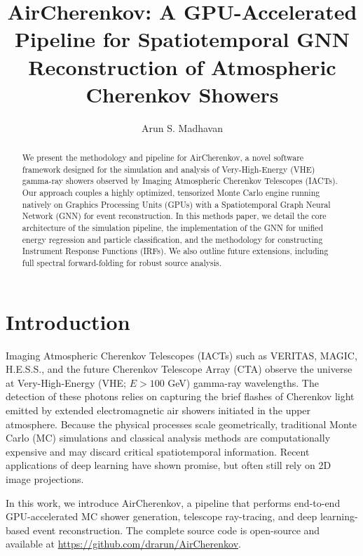 \documentclass[twocolumn,times]{aastex631}
\begin{document}
\title{AirCherenkov: A GPU-Accelerated Pipeline for Spatiotemporal GNN Reconstruction of Atmospheric Cherenkov Showers}

\author{Arun S. Madhavan}

\begin{abstract}
We present the methodology and pipeline for AirCherenkov, a novel software framework designed for the simulation and analysis of Very-High-Energy (VHE) gamma-ray showers observed by Imaging Atmospheric Cherenkov Telescopes (IACTs). Our approach couples a highly optimized, tensorized Monte Carlo engine running natively on Graphics Processing Units (GPUs) with a Spatiotemporal Graph Neural Network (GNN) for event reconstruction. In this methods paper, we detail the core architecture of the simulation pipeline, the implementation of the GNN for unified energy regression and particle classification, and the methodology for constructing Instrument Response Functions (IRFs). We also outline future extensions, including full spectral forward-folding for robust source analysis.
\end{abstract}


\section{Introduction}
Imaging Atmospheric Cherenkov Telescopes (IACTs) such as VERITAS, MAGIC, H.E.S.S., and the future Cherenkov Telescope Array (CTA) observe the universe at Very-High-Energy (VHE; $E > 100$ GeV) gamma-ray wavelengths. The detection of these photons relies on capturing the brief flashes of Cherenkov light emitted by extended electromagnetic air showers initiated in the upper atmosphere. Because the physical processes scale geometrically, traditional Monte Carlo (MC) simulations \citep[e.g., CORSIKA;][]{Heck1998} and classical analysis methods \citep[e.g., Hillas parameterization;][]{Hillas1985} are computationally expensive and may discard critical spatiotemporal information. Recent applications of deep learning \citep[e.g.,][]{Shilon2019} have shown promise, but often still rely on 2D image projections.

In this work, we introduce AirCherenkov, a pipeline that performs end-to-end GPU-accelerated MC shower generation, telescope ray-tracing, and deep learning-based event reconstruction. The complete source code is open-source and available at \url{https://github.com/drarun/AirCherenkov}.
\end{document}
